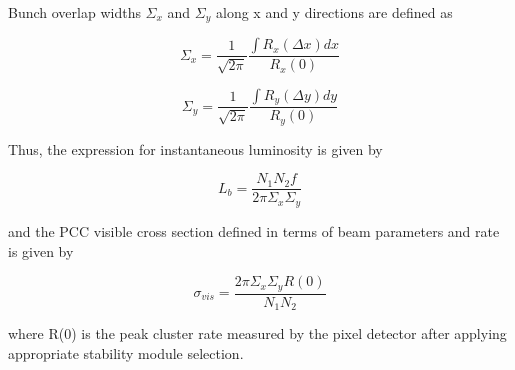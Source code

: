 Bunch overlap widths $\Sigma_x$ and $\Sigma_y$ along x and y directions are defined as 

\begin{equation}
\Sigma_x = \frac{1}{\sqrt{2 \pi}} \frac{\int R_x(\Delta x)dx}{R_x(0)} 
\end{equation}

\begin{equation}
\Sigma_y =  \frac{1}{\sqrt{2 \pi}} \frac{\int R_y(\Delta y)dy}{R_y(0)} 
\end{equation}

Thus, the expression for instantaneous luminosity is given by 

\begin{equation}
L_{b} = \frac{N_1 N_2 f}{2\pi \Sigma_x \Sigma_y}
\end{equation}

and the PCC visible cross section defined in terms of beam parameters and rate is given by 

\begin{equation}
\sigma_{vis} = \frac{2 \pi \Sigma_x \Sigma_y R(0)}{N_1 N_2} 
\end{equation}

where R(0) is the peak cluster rate measured by the pixel detector after applying appropriate stability module selection.



